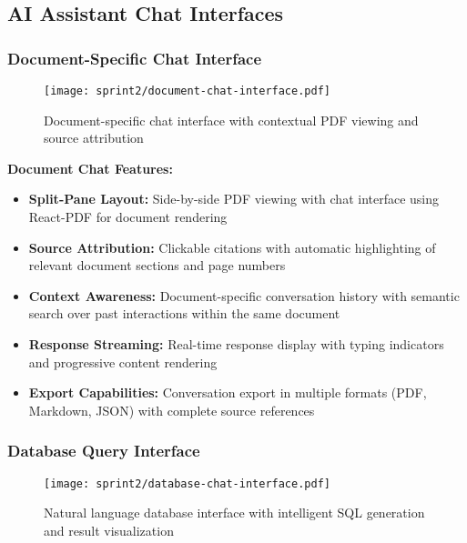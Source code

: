 \subsection{AI Assistant Chat Interfaces}
\label{subsec:chat_interfaces_s3}

\subsubsection{Document-Specific Chat Interface}

\begin{figure}[H]
    \centering
    \texttt{[image: sprint2/document-chat-interface.pdf]}
    \caption{Document-specific chat interface with contextual PDF viewing and source attribution}
    \label{fig:document_chat_s3}
\end{figure}

\textbf{Document Chat Features:}
\begin{itemize}
    \item \textbf{Split-Pane Layout:} Side-by-side PDF viewing with chat interface using React-PDF for document rendering
    \item \textbf{Source Attribution:} Clickable citations with automatic highlighting of relevant document sections and page numbers
    \item \textbf{Context Awareness:} Document-specific conversation history with semantic search over past interactions within the same document
    \item \textbf{Response Streaming:} Real-time response display with typing indicators and progressive content rendering
    \item \textbf{Export Capabilities:} Conversation export in multiple formats (PDF, Markdown, JSON) with complete source references
\end{itemize}

\subsubsection{Database Query Interface}

\begin{figure}[H]
    \centering
    \texttt{[image: sprint2/database-chat-interface.pdf]}
    \caption{Natural language database interface with intelligent SQL generation and result visualization}
    \label{fig:sql_interface_s3}
\end{figure}

